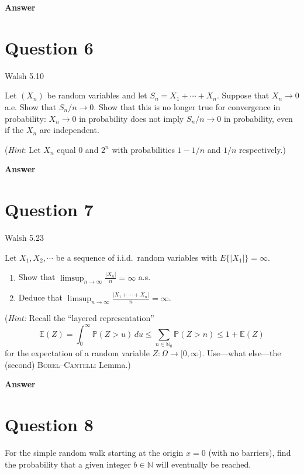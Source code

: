 \documentclass[letterpaper]{article}
\begin{document}
		\textbf{Answer}
		
		\clearpage
		
		\section{Question 6}
		
		{\color{deepred} Walsh 5.10} 
		
		Let $(X_n)$ be random variables and let $S_n=X_1+\cdots+X_n$. Suppose that $X_n\to 0$ a.e. Show that $S_n/n\to 0$. Show that this is no longer true for convergence in probability: $X_n\to 0$ in probability does not imply $S_n/n\to 0$ in probability, even if the $X_n$ are independent.
		
		(\emph{Hint}: Let $X_n$ equal $0$ and $2^n$ with probabilities $1-1/n$ and $1/n$ respectively.)
		
		\textbf{Answer}
		
		\clearpage
		
		\section{Question 7}
		
		{\color{deepred} Walsh 5.23} 
	
	Let $X_1,X_2,\cdots$ be a sequence of i.i.d.\ random variables with $E\{|X_1|\}=\infty$.
	\begin{enumerate}
	\item[(a)] Show that $\displaystyle \limsup_{n\to\infty}\frac{|X_n|}{n}=\infty$ a.s.
	\item[(b)] Deduce that $\displaystyle \limsup_{n\to\infty}\frac{|X_1+\cdots+X_n|}{n}=\infty$.
\end{enumerate}

(\textit{Hint:} Recall the ``layered representation''
\[
\mathbb{E}(Z)=\int_0^\infty \mathbb{P}(Z>u)\,du
\le \sum_{n\in\mathbb{N}_0}\mathbb{P}(Z>n)
\le 1+\mathbb{E}(Z)
\]
for the expectation of a random variable $Z:\Omega\to[0,\infty)$. Use---what else---the (second) \textsc{Borel--Cantelli} Lemma.)

		
		\textbf{Answer}
		
		\clearpage
		
		\section{Question 8}
		
		For the simple random walk starting at the origin $x=0$ (with no barriers), find the probability that a given integer $b\in\mathbb{N}$ will eventually be reached.
		
\end{document}

